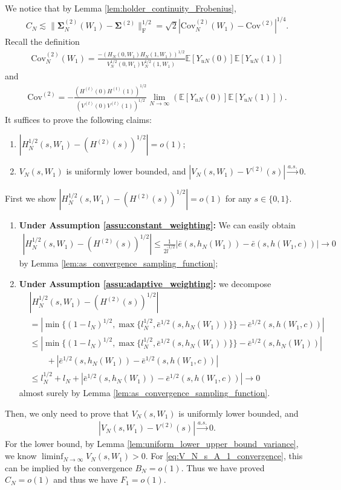 \documentclass[12pt]{article}
\newcommand{\E}{\mathbb E}								%
\begin{document}
We notice that by Lemma \ref{lem:holder_continuity_Frobenius},
\begin{align*}
	C_N\lesssim \|\bm \Sigma_N^{(2)}(W_1)-\bm \Sigma^{(2)}\|_{\mathrm{F}}^{1/2}= \sqrt{2}|\mathrm{Cov}_N^{(2)}(W_1)-\mathrm{Cov}^{(2)}|^{1/4}.
\end{align*}
Recall the definition 
\begin{align*}
	\mathrm{Cov}_N^{(2)}(W_1)=\frac{-(H_N(0,W_1)H_N(1,W_1))^{1/2}}{V_N^{1/2}(0,W_1)V_N^{1/2}(1,W_1)}\E[Y_{uN}(0)]\E[Y_{uN}(1)]
\end{align*}
and 
\begin{align*}
	\mathrm{Cov}^{(2)}=- \frac{(H^{(t)}(0)H^{(t)}(1))^{1/2}}{(V^{(t)}(0)V^{(t)}(1))^{1/2}}\lim_{N\rightarrow\infty}\left(\E[Y_{uN}(0)]\E[Y_{uN}(1)]\right).
\end{align*}
It suffices to prove the following claims: 
\begin{enumerate}
	\item $|H_N^{1/2}(s,W_1)-(H^{(2)}(s))^{1/2}|=o(1)$;
	\item $V_N(s,W_1)$ is uniformly lower bounded, and $|V_N(s,W_1)-V^{(2)}(s)|\overset{a.s.}{\rightarrow}0$.
\end{enumerate}
First we show $|H_N^{1/2}(s,W_1)-(H^{(2)}(s))^{1/2}|=o(1)$ for any $s\in\{0,1\}$. 
\begin{enumerate}
	\item \textbf{Under Assumption \ref{assu:constant_weighting}:} We can easily obtain
	\begin{align*}
		|H_N^{1/2}(s,W_1)-(H^{(2)}(s))^{1/2}|\leq \frac{1}{2\bar l^{1/2}}|\bar e(s,h_N(W_1))-\bar e(s,h(W_1, c))|\rightarrow 0
	\end{align*}
	by Lemma \ref{lem:as_convergence_sampling_function};
	\item \textbf{Under Assumption \ref{assu:adaptive_weighting}:} we decompose 
	\begin{align*}
		&
		|H_N^{1/2}(s,W_1)-(H^{(2)}(s))^{1/2}|\\
		&
		=|\min\{(1-l_N)^{1/2},\max\{l_N^{1/2},\bar e^{1/2}(s,h_N(W_1))\}\}-\bar e^{1/2}(s,h(W_1, c))|\\
		&
		\leq  |\min\{(1-l_N)^{1/2},\max\{l_N^{1/2},\bar e^{1/2}(s,h_N(W_1))\}\}-\bar e^{1/2}(s,h_N(W_1))|\\
		&
		\qquad + |\bar e^{1/2}(s,h_N(W_1))-\bar e^{1/2}(s,h(W_1,c))|\\
		&
		\leq l_N^{1/2}+l_N+|\bar e^{1/2}(s,h_N(W_1))-\bar e^{1/2}(s,h(W_1,c))|\rightarrow 0
	\end{align*}
	almost surely by Lemma \ref{lem:as_convergence_sampling_function}.
\end{enumerate}
Then, we only need to prove that $V_N(s,W_1)$ is uniformly lower bounded, and 
\begin{align}\label{eq:V_N_s_A_1_convergence}
	|V_N(s,W_1)-V^{(2)}(s)|\overset{a.s.}{\rightarrow}0.
\end{align}
For the lower bound, by Lemma \ref{lem:uniform_lower_upper_bound_variance}, we know $\liminf_{N\rightarrow\infty}V_N(s,W_1)>0$. For \eqref{eq:V_N_s_A_1_convergence}, this can be implied by the convergence $B_N=o(1)$. Thus we have proved $C_N=o(1)$ and thus we have $F_1=o(1)$. 
\end{document}
